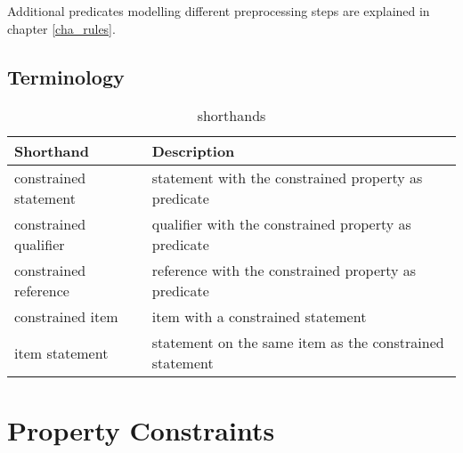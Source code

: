 \documentclass[hyperref,bachelorofscience]{cgvpub}
\begin{document}
Additional predicates modelling different preprocessing steps are explained in chapter \ref{cha_rules}.
\section{Terminology}
\begin{table}[H]
\caption{shorthands}
\begin{tabular}{ll}
Shorthand & Description \\
\hline
constrained statement & statement with the constrained property as predicate \\
constrained qualifier & qualifier with the constrained property as predicate \\
constrained reference & reference with the constrained property as predicate \\
constrained item & item with a constrained statement \\
item statement & statement on the same item as the constrained statement \\
\end{tabular}
\end{table}
\chapter{Property Constraints}

\end{document}
